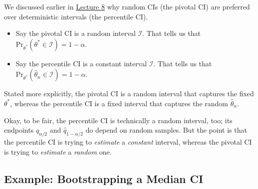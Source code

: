 We discussed earlier in \href{/18.650/lectures/8/#confidence-intervals}{Lecture 8}
why random CIs (the pivotal CI) are preferred over
deterministic intervals (the percentile CI).
\begin{itemize}
    \item Say the pivotal CI is a random interval $\mathcal{I}$.
    That tells us that
    $\mathrm{Pr}_{\theta^*}(\theta^* \in \mathcal{I}) = 1 - \alpha$.
    \item Say the percentile CI is a constant interval $\mathcal{I}$.
    That tells us that
    $\mathrm{Pr}_{\theta^*}(\hat{\theta}_n \in \mathcal{I}) = 1 - \alpha$.
\end{itemize}
Stated more explicitly,
the pivotal CI is a random interval
that captures the fixed $\theta^*$,
whereas the percentile CI is a fixed interval
that captures the random $\hat{\theta}_n$.

\begin{remark}
    Okay, to be fair, the percentile CI is technically
    a random interval, too; its endpoints
    $\hat{q}_{\alpha / 2}$ and $\hat{q}_{1 - \alpha / 2}$
    do depend on random samples.
    But the point is that the percentile CI
    is trying to \emph{estimate} a \emph{constant} interval,
    whereas the pivotal CI is trying to \emph{estimate} a \emph{random} one.
\end{remark}

\subsection{Example: Bootstrapping a Median CI}

